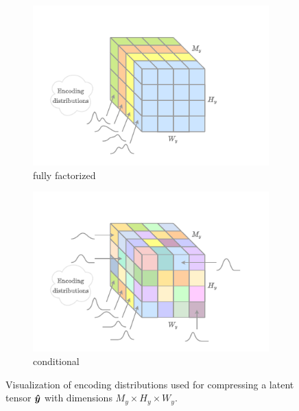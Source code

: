 \begin{figure}[htbp]
  \centering
  \begin{subfigure}[b]{0.5\linewidth}
    \centering
    \includegraphics[width=\linewidth]{img/introduction/encoding-distributions-factorized.pdf}
    \caption{fully factorized}
    \label{fig:intro/encoding-distributions/factorized}
  \end{subfigure}%
  \begin{subfigure}[b]{0.5\linewidth}
    \centering
    \includegraphics[width=\linewidth]{img/introduction/encoding-distributions-conditional.pdf}
    \caption{conditional}
    \label{fig:intro/encoding-distributions/conditional}
  \end{subfigure}%
  \caption[Visualization of encoding distributions for a latent tensor]{%
    Visualization of encoding distributions used for compressing a latent tensor ${\boldsymbol{\hat{y}}}$ with dimensions $M_y \times H_y \times W_y$.
}
\end{figure}
